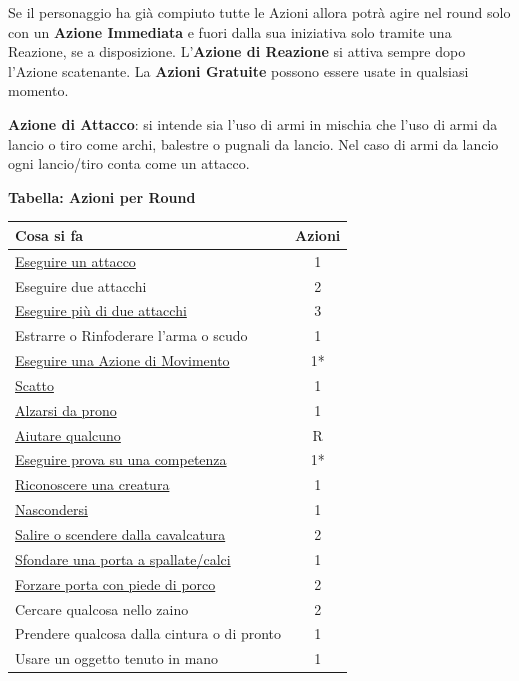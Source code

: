 \begin{multicols}{2}
Se il personaggio ha già compiuto tutte le Azioni allora potrà agire nel round solo con un \textbf{Azione Immediata} e fuori dalla sua iniziativa solo tramite una Reazione, se a disposizione. L'\textbf{Azione di Reazione} si attiva sempre dopo l'Azione scatenante.
La \textbf{Azioni Gratuite} possono essere usate in qualsiasi momento.

\textbf{Azione di Attacco}: si intende sia l'uso di armi in mischia che l'uso di armi da lancio o tiro come archi, balestre o pugnali da lancio. Nel caso di armi da lancio ogni lancio/tiro conta come un attacco.

\textbf{Tabella: Azioni per Round}

\medskip

\noindent\begin{tabular}{lc}
\textbf{Cosa si fa} & \textbf{Azioni}\\
\toprule
\hyperlink{tiropercolpireedifesa}{Eseguire un attacco}& 1\\
Eseguire due attacchi& 2\\
\hyperlink{attacchimultiplimischia}{Eseguire più di due attacchi}& 3\\
Estrarre o Rinfoderare l'arma o scudo& 1\\
\midrule
\hyperlink{tipodimovimento}{Eseguire una Azione di Movimento} &1*\\
\hyperlink{azionediscatto}{Scatto} & 1\\
\hyperlink{alzarsidaprono}{Alzarsi da prono}& 1\\
\midrule
\hyperlink{aiutare}{Aiutare qualcuno}& R\\
\hyperlink{esempiprovecompetenze}{Eseguire prova su una competenza}& 1*\\
\hyperlink{riconosceremostro}{Riconoscere una creatura}& 1\\
\hyperlink{copertura}{Nascondersi}& 1\\
\midrule
\hyperlink{cavalcare}{Salire o scendere dalla cavalcatura}& 2\\
\hyperlink{sfondare}{Sfondare una porta a spallate/calci}& 1\\
\hyperlink{piedediporco}{Forzare porta con piede di porco}& 2\\
\midrule
Cercare qualcosa nello zaino& 2\\
{\small Prendere qualcosa dalla cintura o di pronto} & 1\\
Usare un oggetto tenuto in mano& 1\\

\end{tabular}
\end{multicols}
